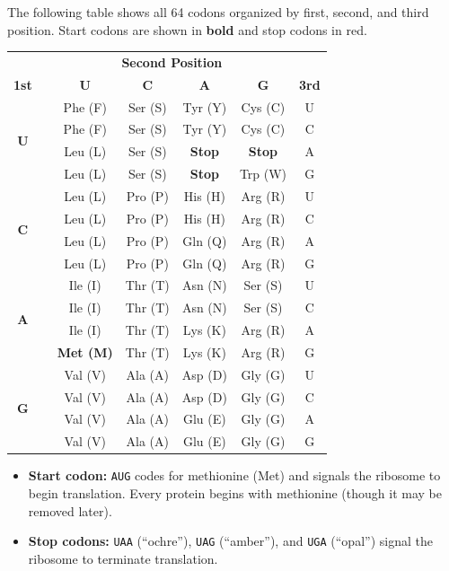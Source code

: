 The following table shows all 64 codons organized by first, second, and third position. Start codons are shown in \textbf{bold} and stop codons in \textcolor{dogmared}{red}.

\begin{center}
\renewcommand{\arraystretch}{1.1}
\footnotesize
\begin{tabular}{c|c|cccc|c}
\toprule
& & \multicolumn{4}{c|}{\textbf{Second Position}} & \\
\textbf{1st} & & \textbf{U} & \textbf{C} & \textbf{A} & \textbf{G} & \textbf{3rd} \\
\midrule
\multirow{4}{*}{\textbf{U}}
  & & Phe (F) & Ser (S) & Tyr (Y) & Cys (C) & U \\
  & & Phe (F) & Ser (S) & Tyr (Y) & Cys (C) & C \\
  & & Leu (L) & Ser (S) & \textcolor{dogmared}{\textbf{Stop}} & \textcolor{dogmared}{\textbf{Stop}} & A \\
  & & Leu (L) & Ser (S) & \textcolor{dogmared}{\textbf{Stop}} & Trp (W) & G \\
\midrule
\multirow{4}{*}{\textbf{C}}
  & & Leu (L) & Pro (P) & His (H) & Arg (R) & U \\
  & & Leu (L) & Pro (P) & His (H) & Arg (R) & C \\
  & & Leu (L) & Pro (P) & Gln (Q) & Arg (R) & A \\
  & & Leu (L) & Pro (P) & Gln (Q) & Arg (R) & G \\
\midrule
\multirow{4}{*}{\textbf{A}}
  & & Ile (I) & Thr (T) & Asn (N) & Ser (S) & U \\
  & & Ile (I) & Thr (T) & Asn (N) & Ser (S) & C \\
  & & Ile (I) & Thr (T) & Lys (K) & Arg (R) & A \\
  & & \textbf{Met (M)} & Thr (T) & Lys (K) & Arg (R) & G \\
\midrule
\multirow{4}{*}{\textbf{G}}
  & & Val (V) & Ala (A) & Asp (D) & Gly (G) & U \\
  & & Val (V) & Ala (A) & Asp (D) & Gly (G) & C \\
  & & Val (V) & Ala (A) & Glu (E) & Gly (G) & A \\
  & & Val (V) & Ala (A) & Glu (E) & Gly (G) & G \\
\bottomrule
\end{tabular}
\end{center}

\begin{itemize}[leftmargin=1.8em]
  \item \textbf{Start codon:} \texttt{AUG} codes for methionine (Met) and signals the ribosome to begin translation. Every protein begins with methionine (though it may be removed later).
  \item \textbf{Stop codons:} \texttt{UAA} (``ochre''), \texttt{UAG} (``amber''), and \texttt{UGA} (``opal'') signal the ribosome to terminate translation.
\end{itemize}


